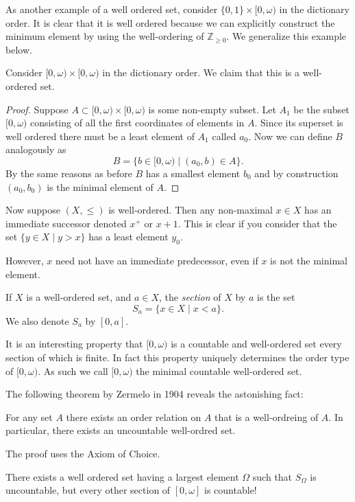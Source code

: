 As another example of a well ordered set, consider $\{0, 1\} \times [0, \omega)$ in the dictionary order. It is clear that it is well ordered because we can explicitly construct the minimum element by using the well-ordering of $\mathbb{Z}_{\geq 0}$. We generalize this example below.

\begin{theorem}
Consider $[0, \omega) \times [0, \omega)$ in the dictionary order. We claim that this is a well-ordered set.
\end{theorem}
\begin{proof}
Suppose $A \subset [0, \omega) \times [0, \omega)$ is some non-empty subset. Let $A_1$ be the subset $[0, \omega)$ consisting of all the first coordinates of elements in $A$. Since its superset is well ordered there must be a least element of $A_1$ called $a_0$. Now we can define $B$ analogously as 
\[B = \{b \in [0,\omega) \mid (a_0, b) \in A\}.\]
By the same reasons as before $B$ has a smallest element $b_0$ and by construction $(a_0, b_0)$ is the minimal element of $A$.
\end{proof}

Now suppose $(X, \leq)$ is well-ordered. Then any non-maximal $x \in X$ has an immediate successor denoted $x^+$ or $x + 1$. This is clear if you consider that the set $\{y \in X \mid y > x\}$ has a least element $y_0$.

However, $x$ need not have an immediate predecessor, even if $x$ is not the minimal element.

\begin{definition}
	If $X$ is a well-ordered set, and $a \in X$, the \textit{section} of $X$ by $a$ is the set 
	\[S_a = \{x \in X \mid x < a\}.\] We also denote $S_a$ by $[0, a]$.
\end{definition}

It is an interesting property that $[0, \omega)$ is a countable and well-ordered set every section of which is finite. In fact this property uniquely determines the order type of $[0, \omega)$. As such we call $[0, \omega)$ the minimal countable well-ordered set.

The following theorem by Zermelo in 1904 reveals the astonishing fact:
\begin{theorem}
For any set $A$ there exists an order relation on $A$ that is a well-ordreing of $A$. In particular, there exists an uncountable well-ordred set.
\end{theorem}
The proof uses the Axiom of Choice.

\begin{proposition}
There exists a well ordered set having a largest element $\Omega$ such that $S_{\Omega}$ is uncountable, but every other section of $[0, \omega]$ is countable!
\end{proposition}
